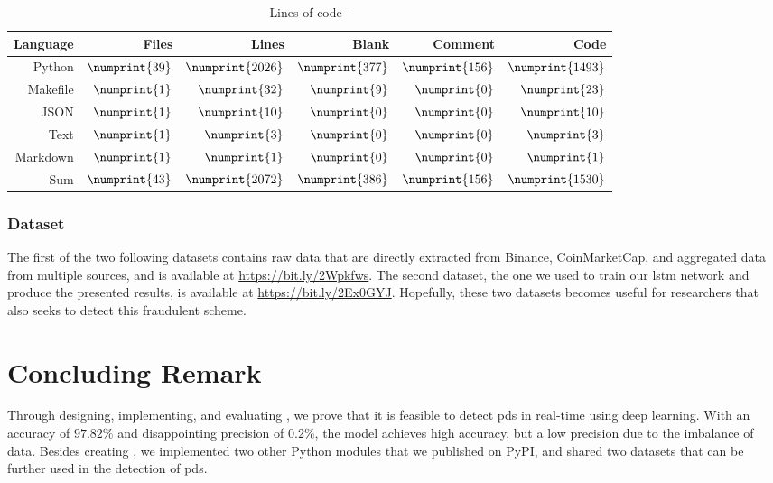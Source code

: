 \begin{table}[ht]
        \centering
        \begin{tabularx}{\textwidth}{ |R|R|R|R|R|R| }\hline
        Language    & Files             & Lines             & Blank             & Comment           & Code              \\\hline
        Python      & $\numprint{39}$   & $\numprint{2026}$ & $\numprint{377}$  & $\numprint{156}$  & $\numprint{1493}$ \\
        Makefile    & $\numprint{1}$    & $\numprint{32}$   & $\numprint{9}$    & $\numprint{0}$    & $\numprint{23}$   \\
        JSON        & $\numprint{1}$    & $\numprint{10}$   & $\numprint{0}$    & $\numprint{0}$    & $\numprint{10}$   \\
        Text        & $\numprint{1}$    & $\numprint{3}$    & $\numprint{0}$    & $\numprint{0}$    & $\numprint{3}$    \\
        Markdown    & $\numprint{1}$    & $\numprint{1}$    & $\numprint{0}$    & $\numprint{0}$    & $\numprint{1}$    \\\hline
        Sum         & $\numprint{43}$   & $\numprint{2072}$ & $\numprint{386}$  & $\numprint{156}$  & $\numprint{1530}$ \\\hline
        \end{tabularx}
        \caption{Lines of code - \project}
        \label{tab:cloc_thesis}
\end{table}

\subsubsection{Dataset}
The first of the two following datasets contains raw data that are directly extracted from Binance, CoinMarketCap, and aggregated data from multiple sources, and is available at \url{https://bit.ly/2Wpkfws}. The second dataset, the one we used to train our \ac{lstm} network and produce the presented results, is available at \url{https://bit.ly/2Ex0GYJ}. Hopefully, these two datasets becomes useful for researchers that also seeks to detect this fraudulent scheme.

\section{Concluding Remark}
Through designing, implementing, and evaluating \project, we prove that it is feasible to detect \acp{pd} in real-time using deep learning. With an accuracy of $97.82\%$ and disappointing precision of $0.2\%$, the model achieves high accuracy, but a low precision due to the imbalance of data. Besides creating \project, we implemented two other Python modules that we published on PyPI, and shared two datasets that can be further used in the detection of \acp{pd}.

